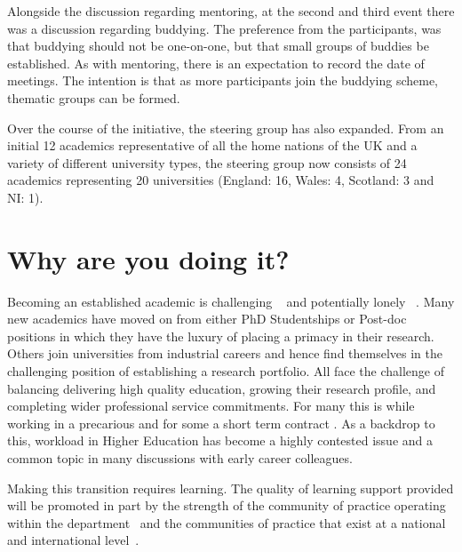 \documentclass[sigconf]{acmart}
\begin{document}
Alongside the discussion regarding mentoring, at the second and third
event there was a discussion regarding buddying. The preference from
the participants, was that buddying should not be one-on-one, but that
small groups of buddies be established. As with mentoring, there is an
expectation to record the date of meetings. The intention is that as
more participants join the buddying scheme, thematic groups can be
formed.

Over the course of the initiative, the steering group has also
expanded. From an initial 12 academics representative of all the home
nations of the UK and a variety of different university types, the
steering group now consists of 24 academics representing 20
universities (England: 16, Wales: 4, Scotland: 3 and NI: 1).

\section{Why are you doing it?}
\label{sec:Why}
Becoming an established academic is challenging ~\cite{Thomas2015} and
potentially lonely ~\cite{Foote2009}. Many new academics have moved on
from either PhD Studentships or Post-doc positions in which they have
the luxury of placing a primacy in their research. Others join
universities from industrial careers and hence find themselves in the
challenging position of establishing a research portfolio. All face
the challenge of balancing delivering high quality education, growing
their research profile, and completing wider professional service
commitments. For many this is while working in a precarious and for
some a short term contract \cite{UCU,JaffeS}. As a backdrop to this,
workload in Higher Education has become a highly contested issue
\cite{UCU2016}and a common topic in many discussions with early career
colleagues.

Making this transition requires learning. The quality of learning
support provided will be promoted in part by the strength of the
community of practice operating within the
department~\cite{Bolander2008} and the communities of practice that
exist at a national and international level~\cite{Thomas2015}.
\end{document}
